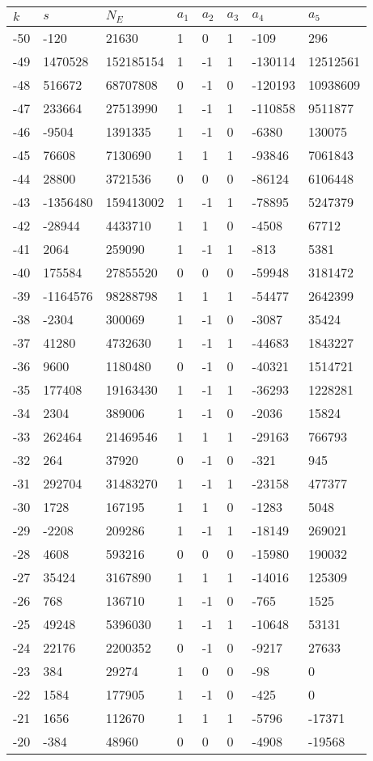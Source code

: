 \documentclass{amsart}
\begin{document}
\begin{longtable}{|l|l|l|lllll|}
\hline
$k$ & $s$ & $N_E$ & $a_1$ & $a_2$ & $a_3$ & $a_4$ & $a_5$\\
\hline
-50&-120&21630&1&0&1&-109&296\\
-49&1470528&152185154&1&-1&1&-130114&12512561\\
-48&516672&68707808&0&-1&0&-120193&10938609\\
-47&233664&27513990&1&-1&1&-110858&9511877\\
-46&-9504&1391335&1&-1&0&-6380&130075\\
-45&76608&7130690&1&1&1&-93846&7061843\\
-44&28800&3721536&0&0&0&-86124&6106448\\
-43&-1356480&159413002&1&-1&1&-78895&5247379\\
-42&-28944&4433710&1&1&0&-4508&67712\\
-41&2064&259090&1&-1&1&-813&5381\\
-40&175584&27855520&0&0&0&-59948&3181472\\
-39&-1164576&98288798&1&1&1&-54477&2642399\\
-38&-2304&300069&1&-1&0&-3087&35424\\
-37&41280&4732630&1&-1&1&-44683&1843227\\
-36&9600&1180480&0&-1&0&-40321&1514721\\
-35&177408&19163430&1&-1&1&-36293&1228281\\
-34&2304&389006&1&-1&0&-2036&15824\\
-33&262464&21469546&1&1&1&-29163&766793\\
-32&264&37920&0&-1&0&-321&945\\
-31&292704&31483270&1&-1&1&-23158&477377\\
-30&1728&167195&1&1&0&-1283&5048\\
-29&-2208&209286&1&-1&1&-18149&269021\\
-28&4608&593216&0&0&0&-15980&190032\\
-27&35424&3167890&1&1&1&-14016&125309\\
-26&768&136710&1&-1&0&-765&1525\\
-25&49248&5396030&1&-1&1&-10648&53131\\
-24&22176&2200352&0&-1&0&-9217&27633\\
-23&384&29274&1&0&0&-98&0\\
-22&1584&177905&1&-1&0&-425&0\\
-21&1656&112670&1&1&1&-5796&-17371\\
-20&-384&48960&0&0&0&-4908&-19568\\

\end{longtable}
\end{document}
